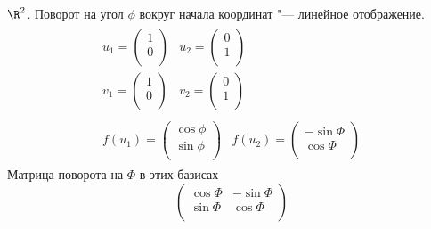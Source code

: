 \begin{exmp}
	$\R^2$.
	Поворот на угол $\phi$ вокруг начала координат "--- линейное отображение.
	\begin{gather*}
		\begin{array}{cc}
			u_1 = \begin{pmatrix}
				1 \\
				0 \\
			\end{pmatrix}
			&
			u_2 = \begin{pmatrix}
				0 \\
				1 \\
			\end{pmatrix}
			\\
			v_1 =
			\begin{pmatrix}
				1 \\
				0 \\
			\end{pmatrix}
			&
			v_2 =
			\begin{pmatrix}
				0 \\
				1 \\
			\end{pmatrix}
		\end{array} \\
		\begin{array}{cc}
			f(u_1) = \begin{pmatrix}
				\cos \phi \\
				\sin \phi \\
			\end{pmatrix}
			&
			f(u_2) = \begin{pmatrix}
				-\sin \Phi \\
				\cos \Phi \\
			\end{pmatrix}
		\end{array}
	\end{gather*}
	Матрица поворота на $\Phi$ в этих базисах
	\[
		\begin{pmatrix}
			\cos \Phi & -\sin \Phi \\
			\sin \Phi & \cos \Phi \\
		\end{pmatrix}
	\]
\end{exmp}

